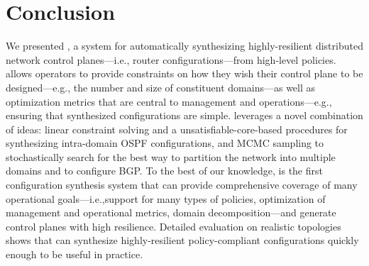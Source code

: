 \section{Conclusion}

We presented \name, a system for automatically synthesizing 
highly-resilient
distributed network control planes---i.e., router configurations---from
high-level policies. \name allows operators to provide constraints on
how they wish their control plane to be designed---e.g., the number and size
of constituent domains---as well as optimization metrics that are
central to management and operations---e.g., ensuring   that  synthesized configurations  are
simple. \name leverages a novel combination of ideas: linear constraint solving
and a unsatisfiable-core-based procedures for synthesizing
intra-domain OSPF configurations, and MCMC sampling to stochastically
search for the best way to partition the network into multiple domains
and to configure BGP. To the best of our knowledge, \name is the first
configuration synthesis system that can  provide comprehensive coverage of
many operational goals---i.e.,support for many types of policies,
optimization of management and operational metrics, domain
decomposition---and generate control planes with high resilience. 
Detailed evaluation on realistic topologies shows
that \name can synthesize highly-resilient policy-compliant configurations quickly enough to be
useful in practice.
